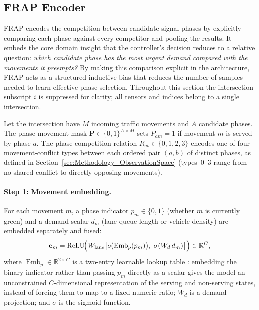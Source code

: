 \subsection{FRAP Encoder}
\label{sec:Methodology_FRAP}

FRAP \citep{zheng2019learning} encodes the competition between candidate signal phases by explicitly comparing each phase against every competitor and pooling the results. It embeds the core domain insight that the controller's decision reduces to a relative question: \emph{which candidate phase has the most urgent demand compared with the movements it preempts?} By making this comparison explicit in the architecture, FRAP acts as a structured inductive bias that reduces the number of samples needed to learn effective phase selection. Throughout this section the intersection subscript $i$ is suppressed for clarity; all tensors and indices belong to a single intersection.

Let the intersection have $M$ incoming traffic movements and $A$ candidate phases. The phase-movement mask $\mathbf{P} \in \{0,1\}^{A \times M}$ sets $P_{am}=1$ if movement $m$ is served by phase $a$. The phase-competition relation $R_{ab} \in \{0,1,2,3\}$ encodes one of four movement-conflict types between each ordered pair $(a, b)$ of distinct phases, as defined in Section~\ref{sec:Methodology_ObservationSpace} (types~0--3 range from no shared conflict to directly opposing movements).

\paragraph{Step 1: Movement embedding.}
For each movement $m$, a phase indicator $p_m\in\{0,1\}$ (whether $m$ is currently green) and a demand scalar $d_m$ (lane queue length or vehicle density) are embedded separately and fused:
\begin{equation}
  \mathbf{e}_m =
    \operatorname{ReLU}\!\Bigl(
      W_{\text{lane}}\bigl[
        \sigma\!\bigl(\operatorname{Emb}_p(p_m)\bigr),\;
        \sigma(W_d\,d_m)
      \bigr]
    \Bigr) \in \mathbb{R}^{C},
  \label{eq:frap_movement_emb}
\end{equation}
where $\operatorname{Emb}_p\in\mathbb{R}^{2\times C}$ is a two-entry learnable lookup table \citep{zheng2019learning}: embedding the binary indicator rather than passing $p_m$ directly as a scalar gives the model an unconstrained $C$-dimensional representation of the serving and non-serving states, instead of forcing them to map to a fixed numeric ratio; $W_d$ is a demand projection; and $\sigma$ is the sigmoid function.


